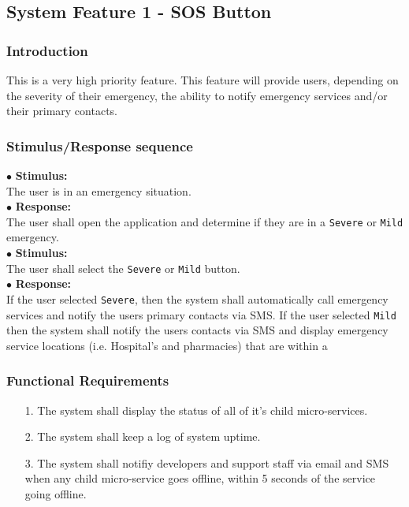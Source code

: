 \documentclass{scrreprt}
\begin{document}
\subsection{System Feature 1 - SOS Button}
\subsubsection{Introduction}
This is a very high priority feature. This feature will provide users, depending on the severity of their emergency, the ability to notify emergency services and/or their primary contacts.

\subsubsection{Stimulus/Response sequence}
\vspace{5mm}
	$\bullet$ \textbf{Stimulus:} \\ \hspace{5mm} The user is in an emergency situation. \\
	$\bullet$ \textbf{Response:} \\ \hspace{5mm} The user shall open the application and determine if they are in a \texttt{Severe} or \texttt{Mild} emergency.
\vspace{5mm}\\
	\hspace{-4.75mm} $\bullet$ \textbf{Stimulus:} \\ \hspace{5mm} The user shall select the \texttt{Severe} or \texttt{Mild} button.\\
	$\bullet$ \textbf{Response:} \\ \hspace{5mm} If the user selected \texttt{Severe}, then the system shall automatically call emergency services and notify the users primary contacts via SMS. If the user selected \texttt{Mild} then the system shall notify the users contacts via SMS and display emergency service locations (i.e. Hospital's and pharmacies) that are within a 
\\
\subsubsection{Functional Requirements}
\begin{enumerate}
	\item[1.] The system shall display the status of all of it's child micro-services.
	\item[2.] The system shall keep a log of system uptime.
	\item[3.] The system shall notifiy developers and support staff via email and SMS when any child micro-service goes offline, within 5 seconds of the service going offline.
\end{enumerate}
\end{document}
